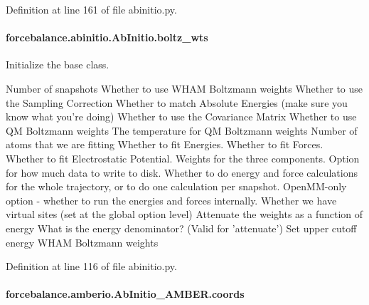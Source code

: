 Definition at line 161 of file abinitio.\-py.

\hypertarget{classforcebalance_1_1abinitio_1_1AbInitio_ac442f096d11d0294235f2c8cbe1dcbb4}{
\paragraph[{boltz\-\_\-wts}]{\setlength{\rightskip}{0pt plus 5cm}forcebalance.\-abinitio.\-Ab\-Initio.\-boltz\-\_\-wts\hspace{0.3cm}{\ttfamily [inherited]}}}\label{classforcebalance_1_1abinitio_1_1AbInitio_ac442f096d11d0294235f2c8cbe1dcbb4}


Initialize the base class. 

Number of snapshots Whether to use W\-H\-A\-M Boltzmann weights Whether to use the Sampling Correction Whether to match Absolute Energies (make sure you know what you're doing) Whether to use the Covariance Matrix Whether to use Q\-M Boltzmann weights The temperature for Q\-M Boltzmann weights Number of atoms that we are fitting Whether to fit Energies. Whether to fit Forces. Whether to fit Electrostatic Potential. Weights for the three components. Option for how much data to write to disk. Whether to do energy and force calculations for the whole trajectory, or to do one calculation per snapshot. Open\-M\-M-\/only option -\/ whether to run the energies and forces internally. Whether we have virtual sites (set at the global option level) Attenuate the weights as a function of energy What is the energy denominator? (Valid for 'attenuate') Set upper cutoff energy W\-H\-A\-M Boltzmann weights 

Definition at line 116 of file abinitio.\-py.

\hypertarget{classforcebalance_1_1amberio_1_1AbInitio__AMBER_adb0ed20ba62b97c3d5c0663ff6039746}{
\paragraph[{coords}]{\setlength{\rightskip}{0pt plus 5cm}forcebalance.\-amberio.\-Ab\-Initio\-\_\-\-A\-M\-B\-E\-R.\-coords}}\label{classforcebalance_1_1amberio_1_1AbInitio__AMBER_adb0ed20ba62b97c3d5c0663ff6039746}


